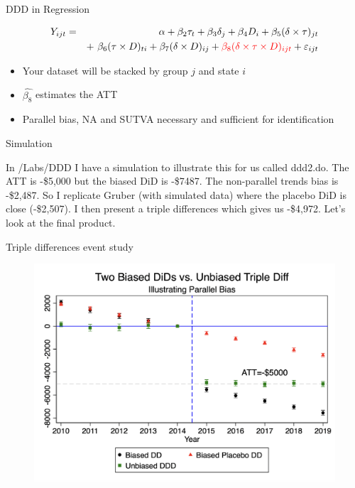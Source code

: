 \documentclass{beamer}
\begin{document}
\begin{frame}{DDD in Regression}

	\begin{eqnarray*}
	Y_{ijt} &=&\alpha +  \beta_2 \tau_t + \beta_3 \delta_j  + \beta_4 D_i + \beta_5(\delta \times \tau)_{jt} \\
	&& +\ \beta_6(\tau \times D)_{ti} +  \beta_7(\delta \times D)_{ij} +  \textcolor{red}{\beta_8(\delta \times \tau \times  D)_{ijt}}+  \varepsilon_{ijt}
	\end{eqnarray*}

	\begin{itemize}
	\item Your dataset will be stacked by group $j$ and state $i$
	\item $\widehat{\beta_8}$ estimates the ATT
	\item Parallel bias, NA and SUTVA necessary and sufficient for identification
	\end{itemize}

\end{frame}



\begin{frame}{Simulation}

In /Labs/DDD I have a simulation to illustrate this for us called ddd2.do.  The ATT is -\$5,000 but the biased DiD is -\$7487.  The non-parallel trends bias is -\$2,487.  So I replicate Gruber (with simulated data) where the placebo DiD is close (-\$2,507).  I then present a triple differences which gives us -\$4,972. Let's look at the final product.

\end{frame}

\begin{frame}{Triple differences event study}

\begin{figure}
\includegraphics[scale=0.25]{./lecture_includes/ddd_simulation}
\end{figure}



\end{frame}
\end{document}
